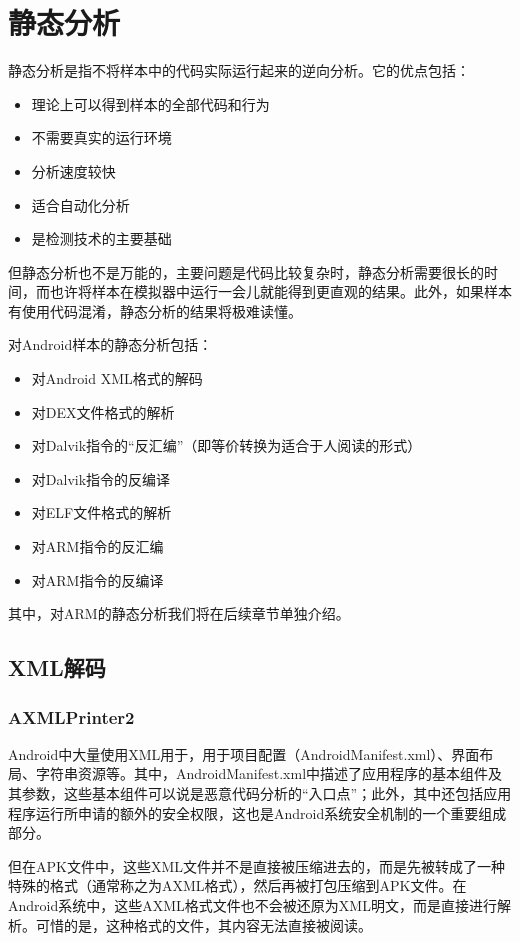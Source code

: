 \chapter{静态分析}
静态分析是指不将样本中的代码实际运行起来的逆向分析。它的优点包括：
\begin{itemize}
  \item 理论上可以得到样本的全部代码和行为
  \item 不需要真实的运行环境
  \item 分析速度较快
  \item 适合自动化分析
  \item 是检测技术的主要基础
\end{itemize}

但静态分析也不是万能的，主要问题是代码比较复杂时，静态分析需要很长的时间，而也许将样本在模拟器中运行一会儿就能得到更直观的结果。此外，如果样本有使用代码混淆，静态分析的结果将极难读懂。

对Android样本的静态分析包括：
\begin{itemize}
  \item 对Android XML格式的解码
  \item 对DEX文件格式的解析
  \item 对Dalvik指令的“反汇编”（即等价转换为适合于人阅读的形式）
  \item 对Dalvik指令的反编译
  \item 对ELF文件格式的解析
  \item 对ARM指令的反汇编
  \item 对ARM指令的反编译
\end{itemize}

其中，对ARM的静态分析我们将在后续章节单独介绍。
\section{XML解码}
\subsection{AXMLPrinter2}
Android中大量使用XML用于，用于项目配置（AndroidManifest.xml）、界面布局、字符串资源等。其中，AndroidManifest.xml中描述了应用程序的基本组件及其参数，这些基本组件可以说是恶意代码分析的“入口点”；此外，其中还包括应用程序运行所申请的额外的安全权限，这也是Android系统安全机制的一个重要组成部分。

但在APK文件中，这些XML文件并不是直接被压缩进去的，而是先被转成了一种特殊的格式（通常称之为AXML格式），然后再被打包压缩到APK文件。在Android系统中，这些AXML格式文件也不会被还原为XML明文，而是直接进行解析。可惜的是，这种格式的文件，其内容无法直接被阅读。

